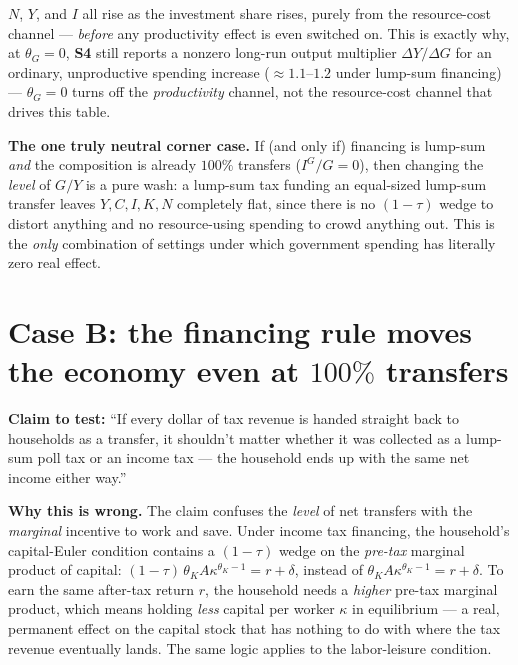 \documentclass[11pt]{article}
\begin{document}
$N$, $Y$, and $I$ all rise as the investment share rises, purely from the
resource-cost channel --- \emph{before} any productivity effect is even
switched on. This is exactly why, at $\theta_G=0$, \textbf{S4} still
reports a nonzero long-run output multiplier $\Delta Y/\Delta G$ for an ordinary,
unproductive spending increase ($\approx 1.1$--$1.2$ under lump-sum
financing) --- $\theta_G=0$ turns off the \emph{productivity} channel, not
the resource-cost channel that drives this table.

\begin{notebox}
\textbf{The one truly neutral corner case.} If (and only if) financing is
lump-sum \emph{and} the composition is already $100\%$ transfers
($I^G/G=0$), then changing the \emph{level} of $G/Y$ is a pure wash: a
lump-sum tax funding an equal-sized lump-sum transfer leaves $Y,C,I,K,N$
completely flat, since there is no $(1-\tau)$ wedge to distort anything and
no resource-using spending to crowd anything out. This is the \emph{only}
combination of settings under which government spending has literally zero
real effect.
\end{notebox}

\section{Case B: the financing rule moves the economy even at $100\%$ transfers}
\label{sec:caseB}

\textbf{Claim to test:} ``If every dollar of tax revenue is handed straight
back to households as a transfer, it shouldn't matter whether it was
collected as a lump-sum poll tax or an income tax --- the household ends up
with the same net income either way.''

\textbf{Why this is wrong.} The claim confuses the \emph{level} of net
transfers with the \emph{marginal} incentive to work and save. Under income
tax financing, the household's capital-Euler condition contains a
$(1-\tau)$ wedge on the \emph{pre-tax} marginal product of capital:
$(1-\tau)\,\theta_K A \kappa^{\theta_K-1}=r+\delta$, instead of
$\theta_K A \kappa^{\theta_K-1}=r+\delta$. To earn the same after-tax return
$r$, the household needs a \emph{higher} pre-tax marginal product, which
means holding \emph{less} capital per worker $\kappa$ in equilibrium --- a
real, permanent effect on the capital stock that has nothing to do with
where the tax revenue eventually lands. The same logic applies to the
labor-leisure condition.
\end{document}
